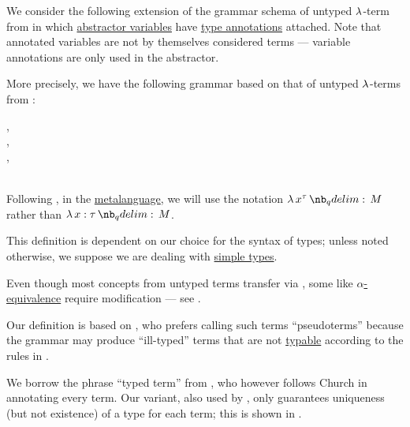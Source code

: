 \begin{definition}\label{def:typed_lambda_term}\mimprovised
  We consider the following extension of the grammar schema of untyped \( \synlambda \)-term from  in which \hyperref[def:lambda_abstractor]{abstractor variables} have \hyperref[con:type_annotation]{type annotations} attached. Note that annotated variables are not by themselves considered terms --- variable annotations are only used in the abstractor.

  More precisely, we have the following grammar based on that of untyped \( \synlambda \)-terms from :
  \begin{bnf*}
     { \bnfsp \bnftsq{:} \bnfsp {}}, \\
      {\bnftsq{\( ( \)} \bnfsp {} \bnfsp {} \bnfsp \bnftsq{\( ) \)}}, \\
      {\bnftsq{\( ( \)} \bnfsp \bnftsq{\( \synlambda \)} \bnfsp {} \bnfsp {} \bnfsp {} \bnfsp \bnftsq{\( ) \)}}, \\
             { \bnfor {} \bnfor} \\
  \end{bnf*}

  Following , in the \hyperref[con:metalanguage]{metalanguage}, we will use the notation \( \qabs {x^\tau} M \) rather than \( \qabs {x: \tau} M \).
\end{definition}
\begin{comments}
  \item This definition is dependent on our choice for the syntax of types; unless noted otherwise, we suppose we are dealing with \hyperref[def:simple_type]{simple types}.

  \item Even though most concepts from untyped terms transfer via , some like \hyperref[def:lambda_term_alpha_equivalence]{\( \alpha \)-equivalence} require modification --- see .

  \item Our definition is based on , who prefers calling such terms \enquote{pseudoterms} because the grammar may produce \enquote{ill-typed} terms that are not \hyperref[def:typability]{typable} according to the rules in .

  We borrow the phrase \enquote{typed term} from , who however follows Church in annotating every term. Our variant, also used by , only guarantees uniqueness (but not existence) of a type for each term; this is shown in .
\end{comments}


